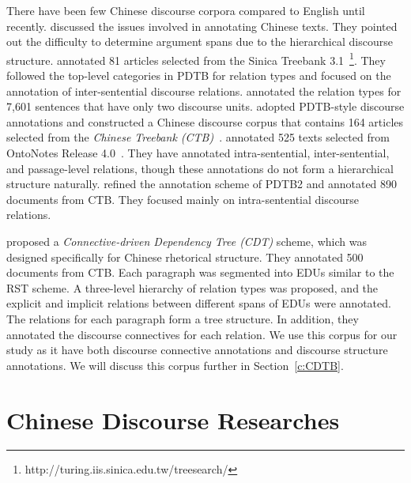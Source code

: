 There have been few Chinese discourse corpora compared to English until recently.
\cite{xue2005annotating} discussed the issues involved in annotating Chinese texts. They
pointed out the difficulty to determine argument spans due to the hierarchical
discourse structure. \cite{huang2011chinese} annotated 81 articles selected from
the Sinica Treebank 3.1~\footnote{http://turing.iis.sinica.edu.tw/treesearch/}. They followed
the top-level categories in PDTB for relation types and focused on the annotation
of inter-sentential discourse relations. \cite{huang2014interpretation} annotated the
relation types for 7,601 sentences that have only two discourse units.
\cite{zhou2012pdtb,zhou2015the} adopted PDTB-style discourse annotations and constructed
a Chinese discourse corpus that contains 164 articles selected from the \textit{Chinese
Treebank (CTB)}~\citep{xue2005penn}. \cite{zhang2014chinese} annotated 525 texts selected
from OntoNotes Release 4.0~\citep{weischedel_ontonotes_2011}. They have annotated
intra-sentential, inter-sentential, and passage-level relations, though
these annotations do not form a hierarchical structure naturally. \cite{zhou2014the}
refined the annotation scheme of PDTB2 and annotated 890 documents from CTB.
They focused mainly on intra-sentential discourse relations.

\cite{li2014building} proposed a \textit{Connective-driven Dependency Tree (CDT)}
scheme, which was designed specifically for Chinese rhetorical structure. They
annotated 500 documents from CTB. Each paragraph was segmented into EDUs similar
to the RST scheme. A three-level hierarchy of relation types was
proposed, and the explicit and implicit relations between different spans of EDUs
were annotated. The relations for each paragraph form a tree structure. In addition,
they annotated the discourse connectives for each relation. We use this corpus
for our study as it have both discourse connective annotations and discourse
structure annotations. We will discuss this corpus further in Section~\ref{c:CDTB}.

\section{Chinese Discourse Researches}


